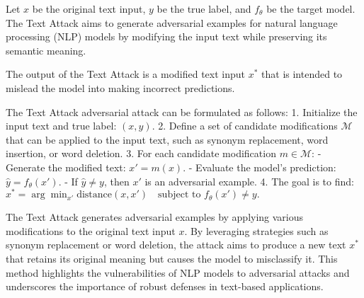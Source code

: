 Let \( x \) be the original text input, \( y \) be the true label, and \( f_{\theta} \) be the target model. The Text Attack aims to generate adversarial examples for natural language processing (NLP) models by modifying the input text while preserving its semantic meaning.

The output of the Text Attack is a modified text input \( x^* \) that is intended to mislead the model into making incorrect predictions.

The Text Attack adversarial attack can be formulated as follows:
1. Initialize the input text and true label:
   $
   (x, y).
   $
2. Define a set of candidate modifications \( \mathcal{M} \) that can be applied to the input text, such as synonym replacement, word insertion, or word deletion.
3. For each candidate modification \( m \in \mathcal{M} \):
   - Generate the modified text:
   $
   x' = m(x).
   $
   - Evaluate the model's prediction:
   $
   \hat{y} = f_{\theta}(x').
   $
   - If \( \hat{y} \neq y \), then \( x' \) is an adversarial example.
4. The goal is to find:
   $
   x^* = \arg\min_{x'} \text{distance}(x, x') \quad \text{subject to } f_{\theta}(x') \neq y.
   $

The Text Attack generates adversarial examples by applying various modifications to the original text input \( x \). By leveraging strategies such as synonym replacement or word deletion, the attack aims to produce a new text \( x^* \) that retains its original meaning but causes the model to misclassify it. This method highlights the vulnerabilities of NLP models to adversarial attacks and underscores the importance of robust defenses in text-based applications.
